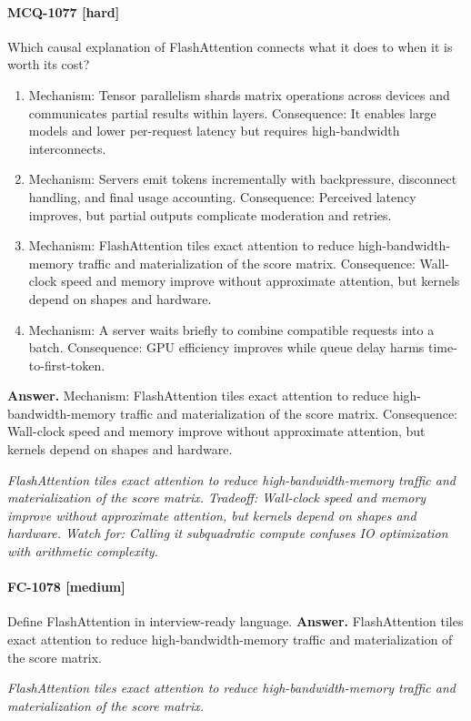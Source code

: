 \paragraph{MCQ-1077 [hard]} Which causal explanation of FlashAttention connects what it does to when it is worth its cost?
\begin{enumerate}[label=\Alph*.]
\item Mechanism: Tensor parallelism shards matrix operations across devices and communicates partial results within layers. Consequence: It enables large models and lower per-request latency but requires high-bandwidth interconnects.
\item Mechanism: Servers emit tokens incrementally with backpressure, disconnect handling, and final usage accounting. Consequence: Perceived latency improves, but partial outputs complicate moderation and retries.
\item Mechanism: FlashAttention tiles exact attention to reduce high-bandwidth-memory traffic and materialization of the score matrix. Consequence: Wall-clock speed and memory improve without approximate attention, but kernels depend on shapes and hardware.
\item Mechanism: A server waits briefly to combine compatible requests into a batch. Consequence: GPU efficiency improves while queue delay harms time-to-first-token.
\end{enumerate}
\noindent\textbf{Answer.} Mechanism: FlashAttention tiles exact attention to reduce high-bandwidth-memory traffic and materialization of the score matrix. Consequence: Wall-clock speed and memory improve without approximate attention, but kernels depend on shapes and hardware.
\par\textit{FlashAttention tiles exact attention to reduce high-bandwidth-memory traffic and materialization of the score matrix. Tradeoff: Wall-clock speed and memory improve without approximate attention, but kernels depend on shapes and hardware. Watch for: Calling it subquadratic compute confuses IO optimization with arithmetic complexity.}
\paragraph{FC-1078 [medium]} Define FlashAttention in interview-ready language.
\noindent\textbf{Answer.} FlashAttention tiles exact attention to reduce high-bandwidth-memory traffic and materialization of the score matrix.
\par\textit{FlashAttention tiles exact attention to reduce high-bandwidth-memory traffic and materialization of the score matrix.}
